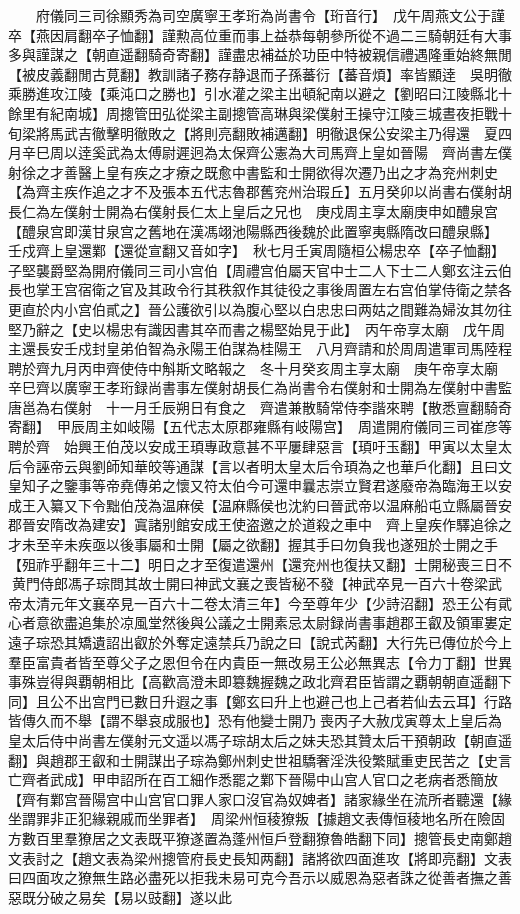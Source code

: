 　　府儀同三司徐顯秀為司空廣寧王孝珩為尚書令【珩音行】　戊午周燕文公于謹卒【燕因肩翻卒子恤翻】謹勲高位重而事上益恭每朝參所從不過二三騎朝廷有大事多與謹謀之【朝直遥翻騎奇寄翻】謹盡忠補益於功臣中特被親信禮遇隆重始終無閒【被皮義翻閒古莧翻】教訓諸子務存静退而子孫蕃衍【蕃音煩】率皆顯逹　吳明徹乘勝進攻江陵【乘沌口之勝也】引水灌之梁主出頓紀南以避之【劉昭曰江陵縣北十餘里有紀南城】周摠管田弘從梁主副摠管高琳與梁僕射王操守江陵三城晝夜拒戰十旬梁將馬武吉徹擊明徹敗之【將則亮翻敗補邁翻】明徹退保公安梁主乃得還　夏四月辛巳周以逹奚武為太傅尉遲迥為太保齊公憲為大司馬齊上皇如晉陽　齊尚書左僕射徐之才善醫上皇有疾之才療之既愈中書監和士開欲得次遷乃出之才為兖州刺史【為齊主疾作追之才不及張本五代志魯郡舊兖州治瑕丘】五月癸卯以尚書右僕射胡長仁為左僕射士開為右僕射長仁太上皇后之兄也　庚戍周主享太廟庚申如醴泉宫【醴泉宫即漢甘泉宫之舊地在漢馮翊池陽縣西後魏於此置寧夷縣隋改曰醴泉縣】　壬戍齊上皇還鄴【還從宣翻又音如字】　秋七月壬寅周隨桓公楊忠卒【卒子恤翻】子堅襲爵堅為開府儀同三司小宫伯【周禮宫伯屬天官中士二人下士二人鄭玄注云伯長也掌王宫宿衛之官及其政令行其秩叙作其徒役之事後周置左右宫伯掌侍衛之禁各更直於内小宫伯貳之】晉公護欲引以為腹心堅以白忠忠曰两姑之間難為婦汝其勿往堅乃辭之【史以楊忠有識因書其卒而書之楊堅始見于此】　丙午帝享太廟　戊午周主還長安壬戍封皇弟伯智為永陽王伯謀為桂陽王　八月齊請和於周周遣軍司馬陸程聘於齊九月丙申齊使侍中斛斯文略報之　冬十月癸亥周主享太廟　庚午帝享太廟　辛巳齊以廣寧王孝珩録尚書事左僕射胡長仁為尚書令右僕射和士開為左僕射中書監唐邕為右僕射　十一月壬辰朔日有食之　齊遣兼散騎常侍李諧來聘【散悉亶翻騎奇寄翻】　甲辰周主如岐陽【五代志太原郡雍縣有岐陽宫】　周遣開府儀同三司崔彦等聘於齊　始興王伯茂以安成王頊專政意甚不平屢肆惡言【頊吁玉翻】甲寅以太皇太后令誣帝云與劉師知華皎等通謀【言以者明太皇太后令頊為之也華戶化翻】且曰文皇知子之鑒事等帝堯傳弟之懷又符太伯今可還申曩志崇立賢君遂廢帝為臨海王以安成王入纂又下令黜伯茂為温麻侯【温麻縣侯也沈約曰晉武帝以温麻船屯立縣屬晉安郡晉安隋改為建安】寘諸别館安成王使盗邀之於道殺之車中　齊上皇疾作驛追徐之才未至辛未疾亟以後事屬和士開【屬之欲翻】握其手曰勿負我也遂殂於士開之手【殂祚乎翻年三十二】明日之才至復遣還州【還兖州也復扶又翻】士開秘喪三日不黄門侍郎馮子琮問其故士開曰神武文襄之喪皆秘不發【神武卒見一百六十卷梁武帝太清元年文襄卒見一百六十二卷太清三年】今至尊年少【少詩沼翻】恐王公有貮心者意欲盡追集於凉風堂然後與公議之士開素忌太尉録尚書事趙郡王叡及領軍婁定遠子琮恐其矯遺詔出叡於外奪定遠禁兵乃說之曰【說式芮翻】大行先已傳位於今上羣臣富貴者皆至尊父子之恩但令在内貴臣一無改易王公必無異志【令力丁翻】世異事殊豈得與覇朝相比【高歡高澄未即簒魏握魏之政北齊君臣皆謂之覇朝朝直遥翻下同】且公不出宫門已數日升遐之事【鄭玄曰升上也避己也上己者若仙去云耳】行路皆傳久而不舉【謂不舉哀成服也】恐有他變士開乃喪丙子大赦戊寅尊太上皇后為皇太后侍中尚書左僕射元文遥以馮子琮胡太后之妹夫恐其贊太后干預朝政【朝直遥翻】與趙郡王叡和士開謀出子琮為鄭州刺史世祖驕奢淫泆役繁賦重吏民苦之【史言亡齊者武成】甲申詔所在百工細作悉罷之鄴下晉陽中山宫人官口之老病者悉簡放【齊有鄴宫晉陽宫中山宫官口罪人家口沒官為奴婢者】諸家緣坐在流所者聽還【緣坐謂罪非正犯緣親戚而坐罪者】　周梁州恒稜獠叛【據趙文表傳恒稜地名所在險固方數百里羣獠居之文表既平獠遂置為蓬州恒戶登翻獠魯皓翻下同】摠管長史南鄭趙文表討之【趙文表為梁州摠管府長史長知两翻】諸將欲四面進攻【將即亮翻】文表曰四面攻之獠無生路必盡死以拒我未易可克今吾示以威恩為惡者誅之從善者撫之善惡既分破之易矣【易以豉翻】遂以此